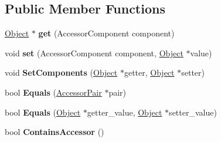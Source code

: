 \subsection*{Public Member Functions}
\begin{DoxyCompactItemize}
\item 
\hyperlink{classv8_1_1internal_1_1_object}{Object} $\ast$ {\bfseries get} (Accessor\+Component component)\hypertarget{classv8_1_1internal_1_1_accessor_pair_a66569cd687b684427f0d9d34514858a6}{}\label{classv8_1_1internal_1_1_accessor_pair_a66569cd687b684427f0d9d34514858a6}

\item 
void {\bfseries set} (Accessor\+Component component, \hyperlink{classv8_1_1internal_1_1_object}{Object} $\ast$value)\hypertarget{classv8_1_1internal_1_1_accessor_pair_ad2a9c19f26306e325c88a48431f1f2c1}{}\label{classv8_1_1internal_1_1_accessor_pair_ad2a9c19f26306e325c88a48431f1f2c1}

\item 
void {\bfseries Set\+Components} (\hyperlink{classv8_1_1internal_1_1_object}{Object} $\ast$getter, \hyperlink{classv8_1_1internal_1_1_object}{Object} $\ast$setter)\hypertarget{classv8_1_1internal_1_1_accessor_pair_a6e5a2de9676c59e75ff73635f152a27d}{}\label{classv8_1_1internal_1_1_accessor_pair_a6e5a2de9676c59e75ff73635f152a27d}

\item 
bool {\bfseries Equals} (\hyperlink{classv8_1_1internal_1_1_accessor_pair}{Accessor\+Pair} $\ast$pair)\hypertarget{classv8_1_1internal_1_1_accessor_pair_a074f0577eb38b61f347071f85120339b}{}\label{classv8_1_1internal_1_1_accessor_pair_a074f0577eb38b61f347071f85120339b}

\item 
bool {\bfseries Equals} (\hyperlink{classv8_1_1internal_1_1_object}{Object} $\ast$getter\+\_\+value, \hyperlink{classv8_1_1internal_1_1_object}{Object} $\ast$setter\+\_\+value)\hypertarget{classv8_1_1internal_1_1_accessor_pair_aeb0ab989aa8c299311ea5ad17c496732}{}\label{classv8_1_1internal_1_1_accessor_pair_aeb0ab989aa8c299311ea5ad17c496732}

\item 
bool {\bfseries Contains\+Accessor} ()\hypertarget{classv8_1_1internal_1_1_accessor_pair_a3776e1f65c6612d9cb544747211bd3f0}{}\label{classv8_1_1internal_1_1_accessor_pair_a3776e1f65c6612d9cb544747211bd3f0}

\end{DoxyCompactItemize}
